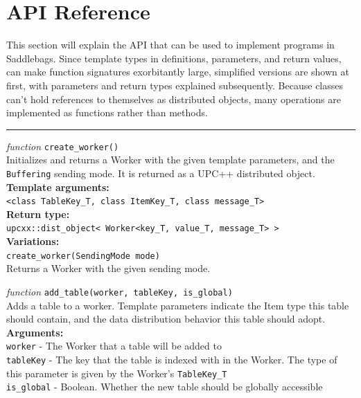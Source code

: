 \documentclass{uit-report}
\begin{document}
\chapter{API Reference}
This section will explain the API that can be used to implement programs in Saddlebags. Since template types in definitions, parameters, and return values, can make function signatures exorbitantly large, simplified versions are shown at first, with parameters and return types explained subsequently. Because classes can't hold references to themselves as distributed objects, many operations are implemented as functions rather than methods.
\vskip 0.6cm
\begin{center}
	\noindent\rule{4cm}{1.2pt}
\end{center}
\vskip 0.5cm
\textit{function} \texttt{create\_worker()}\\
\phantom{11111} Initializes and returns a Worker with the given template parameters, and the \texttt{Buffering} sending mode. It is returned as a UPC++ distributed object. \\
\textbf{Template arguments:}\\
\phantom{11111} \texttt{<class TableKey\_T, class ItemKey\_T, class message\_T>}\\
\textbf{Return type:}\\
\phantom{11111}  \texttt{upcxx::dist\_object< Worker<key\_T, value\_T, message\_T> >}\\
\textbf{Variations:}\\
\phantom{11111} \texttt{create\_worker(SendingMode mode)}\\
\phantom{11111}\phantom{11111} Returns a Worker with the given sending mode.

\newpage
\textit{function} \texttt{add\_table(worker, tableKey, is\_global)}\\
\phantom{11111} Adds a table to a worker. Template parameters indicate the Item type this table should contain, and the data distribution behavior this table should adopt.\\
\textbf{Arguments:}\\
\phantom{11111} \texttt{worker} - The Worker that a table will be added to\\
\phantom{11111} \texttt{tableKey} - The key that the table is indexed with in the Worker. The type of this parameter is given by the Worker's \texttt{TableKey\_T}\\
\phantom{11111} \texttt{is\_global} - Boolean. Whether the new table should be globally accessible
\end{document}
